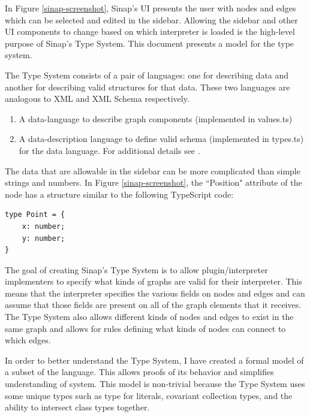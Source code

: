 \documentclass[12pt]{article}
\begin{document}
In Figure \ref{sinap-screenshot}, Sinap's UI
presents the user with nodes and edges which can be selected 
and edited in the sidebar. Allowing the sidebar and other UI components to change based
on which interpreter is loaded is the high-level purpose of Sinap's Type System. 
This document presents a model for the type system. 

The Type System consists of a pair of languages:
one for describing data and another for describing valid structures
for that data. These two languages are analogous to XML and XML Schema
\cite{Thompson:12:WXS} respectively.

\begin{enumerate}
    \item A data-language to describe graph components 
    (implemented in values.ts)
    \item A data-description language to define valid schema 
    (implemented in types.ts)
    for the data language. For additional details see \cite{sinap-types-code}.
\end{enumerate}

The data that are allowable in the sidebar can be more complicated than
simple strings and numbers. In Figure \ref{sinap-screenshot}, the ``Position" attribute
of the node has a structure similar to the following TypeScript code:

\vspace{1ex}

\linespread{1}
\begin{verbatim}
type Point = {
    x: number;
    y: number;
}
\end{verbatim}

The goal of creating Sinap's Type System is to allow plugin/interpreter
implementers to specify what 
kinds of graphs are valid for their interpreter. This means that 
the interpreter specifies the various fields on nodes and edges 
and can assume that those fields are present on all of the graph elements
that it receives. The Type System also allows different kinds of nodes and 
edges to exist in the same graph and allows for rules defining what kinds of
nodes can connect to which edges. 

In order to better understand the Type System, I have created a 
formal model of a subset of the language. This allows proofs of
its behavior and simplifies understanding of system. This model 
is non-trivial because the Type System uses some unique types 
such as type for literals, covariant collection types, and the
ability to intersect class types together. 
\end{document}
